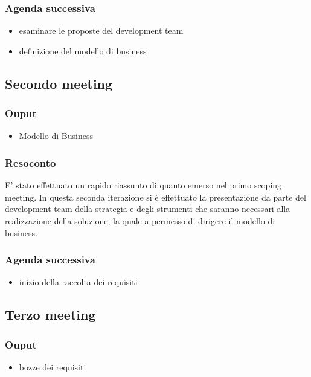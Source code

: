 \subsubsection*{Agenda successiva}
\begin{itemize}
    \item esaminare le proposte del development team
    \item definizione del modello di business
\end{itemize} 



\subsection*{Secondo meeting}
\subsubsection*{Ouput}
\begin{itemize}
    \item Modello di Business
\end{itemize} 
\subsubsection*{Resoconto}
E' stato effettuato un rapido riassunto di quanto emerso nel primo scoping meeting. In questa seconda iterazione 
si è effettuato la presentazione da parte del development team della strategia e degli strumenti 
che saranno necessari alla realizzazione della soluzione, la quale a permesso di dirigere il modello di business.
\subsubsection*{Agenda successiva}
\begin{itemize}
    \item inizio della raccolta dei requisiti
\end{itemize} 



\subsection*{Terzo meeting}
\subsubsection*{Ouput}
\begin{itemize}
    \item bozze dei requisiti
\end{itemize} 
